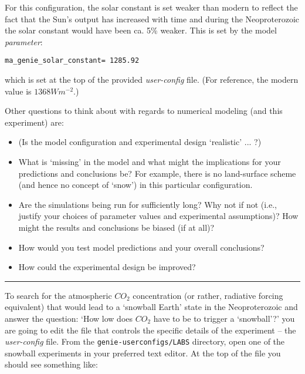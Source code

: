 \documentclass[11pt,fleqn]{book} %
\begin{document}
For this configuration, the solar constant is set weaker than modern to reflect the fact that the Sun’s output has increased with time and during the Neoproterozoic the solar constant would have been ca. 5\% weaker. This is set by the model \textit{parameter}:

\vspace{-1mm}
\begin{verbatim}
ma_genie_solar_constant= 1285.92
\end{verbatim}
\vspace{-1mm}

\noindent which is set at the top of the provided \textit{user-config} file. (For reference, the modern value is \( 1368 Wm^{-2}\).)

\vspace{1mm}

\pagebreak

Other questions to think about with regards to numerical modeling (and this experiment) are:

\begin{itemize}[noitemsep]
\setlength{\itemindent}{.2in}
\vspace{1mm}
\item  (Is the model configuration and experimental design ‘realistic’ ... ?)
\vspace{1mm}
\item  What is ‘missing’ in the model and what might the implications for your predictions and conclusions be? For example, there is no land-surface scheme (and hence no concept of ‘snow’) in this particular configuration.
\vspace{1mm}
\item Are the simulations being run for sufficiently long? Why not if not (i.e., justify your choices of parameter values and experimental assumptions)? How might the results and conclusions be biased (if at all)?
\vspace{1mm}
\item How would you test model predictions and your overall conclusions?
\vspace{1mm}
\item How could the experimental design be improved?
\end{itemize}

\vspace{1mm}
\noindent\rule{4cm}{0.5pt}
\vspace{2mm}

\noindent To search for the atmospheric \(CO_{2}\) concentration (or rather, radiative forcing equivalent) that would lead to a ‘snowball Earth’ state in the Neoproterozoic and answer the question:
‘How low does \(CO_{2}\) have to be to trigger a ‘snowball’?’
you are going to edit the file that controls the specific details of the experiment -- the \textit{user-config} file. From the \texttt{genie-userconfigs/LABS} directory, open one of the snowball experiments in your preferred  text editor. At the top of the file you should see something like:
\end{document}
